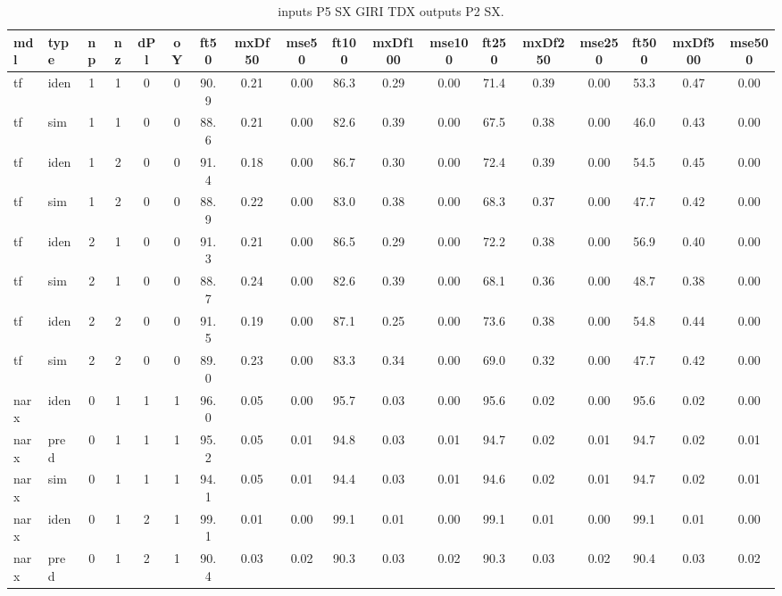 \begin{landscape} 
 \begin{center} 
\begin{longtable}{ll|cccc|ccc|ccc|ccc|ccc} 
\caption[inputs P5 SX GIRI TDX   outputs P2 SX]{inputs P5 SX GIRI TDX   outputs P2 SX.} 
\label{tab:inputs_P5_SX_GIRI_TDX___outputs_P2_SX} 
\hline 
  mdl & type & np & nz & dPl & oY & ft50 & mxDf50 & mse50 & ft100 & mxDf100 & mse100 & ft250 & mxDf250 & mse250 & ft500 & mxDf500 & mse500 \\ 
 \hline 
tf  & iden & 1 & 1 & 0 & 0 & 90.9 & 0.21 & 0.00 & 86.3 & 0.29 & 0.00 & 71.4 & 0.39 & 0.00 & 53.3 & 0.47 & 0.00 \\ 
tf  & sim  & 1 & 1 & 0 & 0 & 88.6 & 0.21 & 0.00 & 82.6 & 0.39 & 0.00 & 67.5 & 0.38 & 0.00 & 46.0 & 0.43 & 0.00 \\ 
 \hline 
tf  & iden & 1 & 2 & 0 & 0 & 91.4 & 0.18 & 0.00 & 86.7 & 0.30 & 0.00 & 72.4 & 0.39 & 0.00 & 54.5 & 0.45 & 0.00 \\ 
tf  & sim  & 1 & 2 & 0 & 0 & 88.9 & 0.22 & 0.00 & 83.0 & 0.38 & 0.00 & 68.3 & 0.37 & 0.00 & 47.7 & 0.42 & 0.00 \\ 
 \hline 
tf  & iden & 2 & 1 & 0 & 0 & 91.3 & 0.21 & 0.00 & 86.5 & 0.29 & 0.00 & 72.2 & 0.38 & 0.00 & 56.9 & 0.40 & 0.00 \\ 
tf  & sim  & 2 & 1 & 0 & 0 & 88.7 & 0.24 & 0.00 & 82.6 & 0.39 & 0.00 & 68.1 & 0.36 & 0.00 & 48.7 & 0.38 & 0.00 \\ 
 \hline 
tf  & iden & 2 & 2 & 0 & 0 & 91.5 & 0.19 & 0.00 & 87.1 & 0.25 & 0.00 & 73.6 & 0.38 & 0.00 & 54.8 & 0.44 & 0.00 \\ 
tf  & sim  & 2 & 2 & 0 & 0 & 89.0 & 0.23 & 0.00 & 83.3 & 0.34 & 0.00 & 69.0 & 0.32 & 0.00 & 47.7 & 0.42 & 0.00 \\ 
 \hline 
narx & iden & 0 & 1 & 1 & 1 & 96.0 & 0.05 & 0.00 & 95.7 & 0.03 & 0.00 & 95.6 & 0.02 & 0.00 & 95.6 & 0.02 & 0.00 \\ 
narx & pred & 0 & 1 & 1 & 1 & 95.2 & 0.05 & 0.01 & 94.8 & 0.03 & 0.01 & 94.7 & 0.02 & 0.01 & 94.7 & 0.02 & 0.01 \\ 
narx & sim  & 0 & 1 & 1 & 1 & 94.1 & 0.05 & 0.01 & 94.4 & 0.03 & 0.01 & 94.6 & 0.02 & 0.01 & 94.7 & 0.02 & 0.01 \\ 
 \hline 
narx & iden & 0 & 1 & 2 & 1 & 99.1 & 0.01 & 0.00 & 99.1 & 0.01 & 0.00 & 99.1 & 0.01 & 0.00 & 99.1 & 0.01 & 0.00 \\ 
narx & pred & 0 & 1 & 2 & 1 & 90.4 & 0.03 & 0.02 & 90.3 & 0.03 & 0.02 & 90.3 & 0.03 & 0.02 & 90.4 & 0.03 & 0.02 \\ 

\end{longtable}
\end{center}
\end{landscape}
